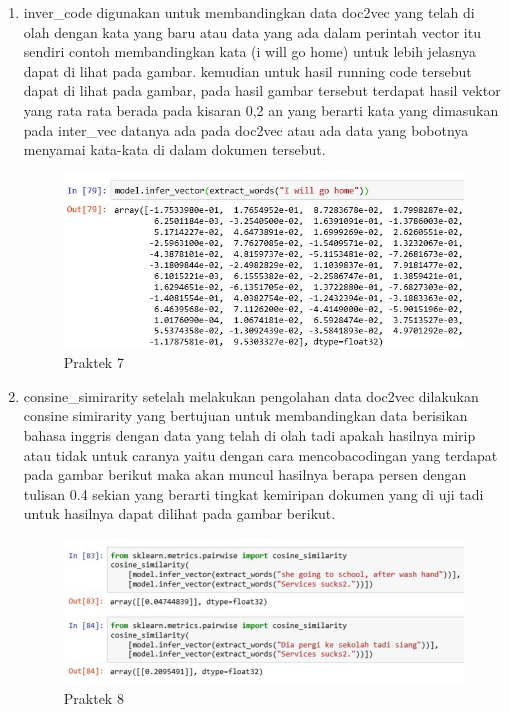 \begin{enumerate}
\item inver\_code digunakan untuk membandingkan data doc2vec yang telah di olah dengan kata yang baru atau data yang ada dalam perintah vector itu sendiri contoh membandingkan kata (i will go home) untuk lebih jelasnya dapat di lihat pada gambar. kemudian untuk hasil running code tersebut dapat di lihat pada gambar, pada hasil gambar tersebut terdapat hasil vektor yang rata rata berada pada kisaran 0,2 an yang berarti kata yang dimasukan pada inter\_vec datanya ada pada doc2vec atau ada data yang bobotnya menyamai kata-kata di dalam dokumen tersebut.

\begin{figure}[ht]
\centering
\includegraphics[scale=0.6]{figures/1174008/5/2,7.PNG}
\caption{Praktek 7}
\end{figure}

\item consine\_simirarity setelah melakukan pengolahan data doc2vec dilakukan consine simirarity yang bertujuan untuk membandingkan data berisikan bahasa inggris dengan data yang telah di olah tadi apakah hasilnya mirip atau tidak untuk caranya yaitu dengan cara mencobacodingan yang terdapat pada gambar berikut maka akan muncul hasilnya berapa persen dengan tulisan 0.4 sekian yang berarti tingkat kemiripan dokumen yang di uji tadi untuk hasilnya dapat dilihat pada gambar berikut.

\begin{figure}[ht]
\centering
\includegraphics[scale=0.6]{figures/1174008/5/2,8.PNG}
\caption{Praktek 8}
\end{figure}


\end{enumerate}
